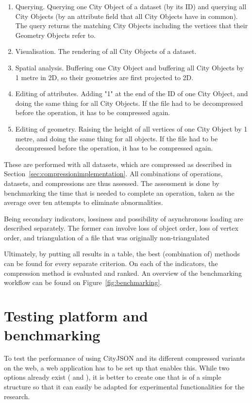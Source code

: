 \begin{enumerate}
\item Querying. Querying one City Object of a dataset (by its ID) and querying all City Objects (by an attribute field that all City Objects have in common). The query returns the matching City Objects including the vertices that their Geometry Objects refer to.
\item Visualisation. The rendering of all City Objects of a dataset.
\item Spatial analysis. Buffering one City Object and buffering all City Objects by 1 metre in 2D, so their geometries are first projected to 2D.
\item Editing of attributes. Adding "1" at the end of the ID of one City Object, and doing the same thing for all City Objects. If the file had to be decompressed before the operation, it has to be compressed again.
\item Editing of geometry. Raising the height of all vertices of one City Object by 1 metre, and doing the same thing for all objects. If the file had to be decompressed before the operation, it has to be compressed again.
\end{enumerate}


These are performed with all datasets, which are compressed as described in Section~\ref{sec:compressionimplementation}.
All combinations of operations, datasets, and compressions are thus assessed.
The assessment is done by benchmarking the time that is needed to complete an operation, taken as the average over ten attempts to eliminate abnormalities.


Being secondary indicators, lossiness and possibility of asynchronous loading are described separately.
The former can involve loss of object order, loss of vertex order, and triangulation of a file that was originally non-triangulated

Ultimately, by putting all results in a table, the best (combination of) methods can be found for every separate criterion.
On each of the indicators, the compression method is evaluated and ranked.
An overview of the benchmarking workflow can be found on Figure~\ref{fig:benchmarking}.


\section{Testing platform and benchmarking}
\label{methtestingplatform}

To test the performance of using CityJSON and its different compressed variants on the web, a web application has to be set up that enables this.
While two options already exist (\citet{Boersma2019} and \citet{CityJSON2020}), it is better to create one that is of a simple structure so that it can easily be adapted for experimental functionalities for the research.

